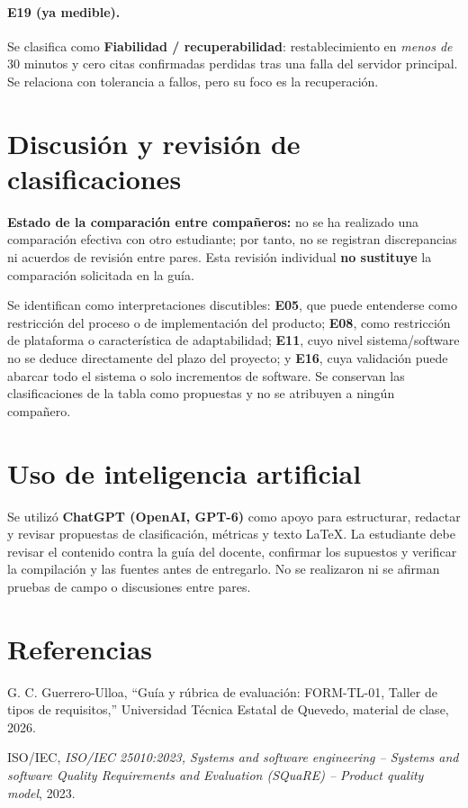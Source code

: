 \documentclass[11pt,a4paper]{article}
\begin{document}
\paragraph{E19 (ya medible).} Se clasifica como \textbf{Fiabilidad / recuperabilidad}: restablecimiento en \emph{menos de} 30 minutos y cero citas confirmadas perdidas tras una falla del servidor principal. Se relaciona con tolerancia a fallos, pero su foco es la recuperación.
\section{Discusión y revisión de clasificaciones}
\textbf{Estado de la comparación entre compañeros:} no se ha realizado una comparación efectiva con otro estudiante; por tanto, no se registran discrepancias ni acuerdos de revisión entre pares. Esta revisión individual \textbf{no sustituye} la comparación solicitada en la guía.

Se identifican como interpretaciones discutibles: \textbf{E05}, que puede entenderse como restricción del proceso o de implementación del producto; \textbf{E08}, como restricción de plataforma o característica de adaptabilidad; \textbf{E11}, cuyo nivel sistema/software no se deduce directamente del plazo del proyecto; y \textbf{E16}, cuya validación puede abarcar todo el sistema o solo incrementos de software. Se conservan las clasificaciones de la tabla como propuestas y no se atribuyen a ningún compañero.
\section{Uso de inteligencia artificial}
Se utilizó \textbf{ChatGPT (OpenAI, GPT-6)} como apoyo para estructurar, redactar y revisar propuestas de clasificación, métricas y texto LaTeX. La estudiante debe revisar el contenido contra la guía del docente, confirmar los supuestos y verificar la compilación y las fuentes antes de entregarlo. No se realizaron ni se afirman pruebas de campo o discusiones entre pares.
\section{Referencias}
\begin{enumerate}[label={[\arabic*]}]
\item G. C. Guerrero-Ulloa, ``Guía y rúbrica de evaluación: FORM-TL-01, Taller de tipos de requisitos,'' Universidad Técnica Estatal de Quevedo, material de clase, 2026.
\item ISO/IEC, \emph{ISO/IEC 25010:2023, Systems and software engineering -- Systems and software Quality Requirements and Evaluation (SQuaRE) -- Product quality model}, 2023.
\end{enumerate}
\end{document}
